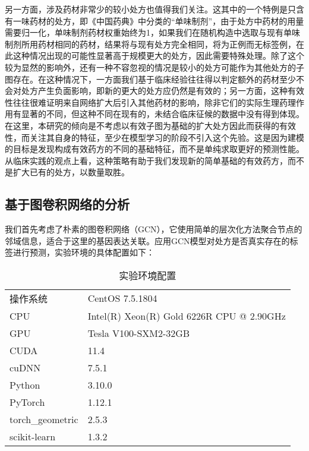 另一方面，涉及药材非常少的较小处方也值得我们关注。这其中的一个特例是只含有一味药材的处方，即《中国药典》中分类的“单味制剂”，由于处方中药材的用量需要归一化，单味制剂药材权重始终为1，如果我们在随机构造中选取与现有单味制剂所用药材相同的药材，结果将与现有处方完全相同，将为正例而无标签例，在此这种情况出现的可能性显著高于规模更大的处方，因此需要特殊处理。除了这个较为显然的影响外，还有一种不容忽视的情况是较小的处方可能作为其他处方的子图存在。在这种情况下，一方面我们基于临床经验往往得以判定额外的药材至少不会对处方产生负面影响，即新的更大的处方应仍然是有效的；另一方面，这种有效性往往很难证明来自网络扩大后引入其他药材的影响，除非它们的实际生理药理作用有显著的不同，但这种不同在现有的，未结合临床征候的数据中没有得到体现。在这里，本研究的倾向是不考虑以有效子图为基础的扩大处方因此而获得的有效性，而关注其自身的特征，至少在模型学习的阶段不引入这个先验。这是因为建模的目标是发现构成有效药方的不同的基础特征，而不是单纯求取更好的预测性能。从临床实践的观点上看，这种策略有助于我们发现新的简单基础的有效药方，而不是扩大已有的处方，以数量取胜。

\subsection{基于图卷积网络的分析}

我们首先考虑了朴素的图卷积网络（GCN），它使用简单的层次化方法聚合节点的邻域信息，适合于这里的基因表达关联。应用GCN模型对处方是否真实存在的标签进行预测，实验环境的具体配置如下：


\begin{table}
  \centering
  \caption{实验环境配置}
  \begin{tabular}{ll}
    \toprule
    操作系统             & CentOS 7.5.1804                           \\
    CPU              & Intel(R) Xeon(R) Gold 6226R CPU @ 2.90GHz \\
    GPU              & Tesla V100-SXM2-32GB                      \\
    CUDA             & 11.4                                      \\
    cuDNN            & 7.5.1                                     \\
    Python           & 3.10.0                                    \\
    PyTorch          & 1.12.1                                    \\
    torch\_geometric & 2.5.3                                     \\
    scikit-learn     & 1.3.2                                     \\
    \bottomrule
  \end{tabular}
  \label{tab:three-line}
\end{table}

